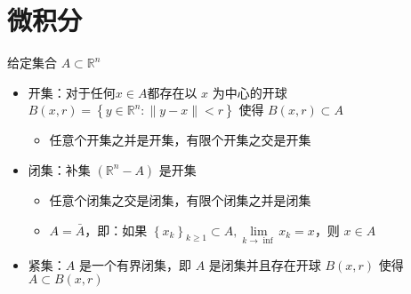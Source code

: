 


\newcommand\Title{智能计算数学基础笔记}
\renewcommand\due{due: November 6, 2022}
\newcommand\tr{\operatorname{tr}} %
\newcommand\dom{\operatorname{dom}} %
\newcommand\diag{\operatorname{diag}} %
\newcommand\epi{\operatorname{epi}} %
\newcommand\minimize{\operatorname{minimize}} %
\newcommand\maximize{\operatorname{maximize}} %
\newcommand\subject{\operatorname{subject\ to}}
\newcommand\rank{\operatorname{rank}} %





\section{微积分}
\begin{remark}
    给定集合 $A \subset \mathbb{R}^n$\begin{itemize}
        \item 开集：对于任何$x \in A$都存在以 $x$ 为中心的开球 $B(x, r) = \left\{y \in \mathbb{R}^n: \|y - x\| < r\right\}$ 使得 $B(x, r) \subset A$\begin{itemize}
            \item 任意个开集之并是开集，有限个开集之交是开集
        \end{itemize}
        \item 闭集：补集 $(\mathbb{R}^n - A)$ 是开集\begin{itemize}
            \item 任意个闭集之交是闭集，有限个闭集之并是闭集
            \item $A = \bar{A}$，即：如果 $\left\{x_k\right\}_{k \ge 1} \subset A,\underset{k \to \inf}{\lim}x_k = x$，则 $x \in A$
        \end{itemize}
        \item  紧集：$A$ 是一个有界闭集，即 $A$ 是闭集并且存在开球 $B(x, r)$ 使得 $A \subset B(x, r)$
    \end{itemize}
\end{remark}


